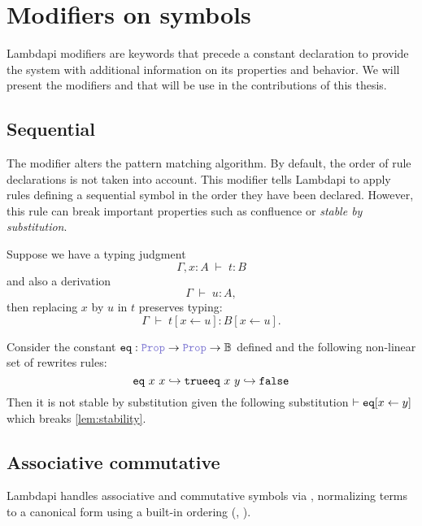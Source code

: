 \section{Modifiers on symbols}

Lambdapi modifiers are keywords that precede a constant declaration to provide the system with additional information on its properties and behavior.
We will present the modifiers  and  that will be use in the contributions of this thesis.

\subsection{Sequential}

The modifier  alters the pattern matching algorithm.
By default, the order of rule declarations is not taken into account.
This modifier tells Lambdapi to apply rules defining a sequential symbol in the order they have been declared.
However, this rule can break important properties such as confluence or \emph{stable by substitution}.

\begin{lemma}\label{lem:stability}
Suppose we have a typing judgment
\[
  \Gamma, x : A \;\vdash\; t : B
\]
and also a derivation
\[
  \Gamma \;\vdash\; u : A ,
\]
then replacing $x$ by $u$ in $t$ preserves typing:
\[
  \Gamma \;\vdash\; t[x \leftarrow u] : B[x \leftarrow u] .
\]
\end{lemma}

\begin{example}
Consider the constant $\kw{eq}: \prop \ra \prop \ra \B$ defined  and the following non-linear set of rewrites rules:
\[
    \texttt{\upshape{eq}}~x~x \hookrightarrow \texttt{\upshape{true}}\\
    \texttt{\upshape{eq}}~x~y \hookrightarrow \texttt{\upshape{false}}
\]
Then it is not stable by substitution given the following substitution $\vdash\texttt{\upshape{eq}}[x \leftarrow y]$ which breaks \cref{lem:stability}.
\end{example}

\subsection{Associative commutative}

Lambdapi handles associative and commutative symbols via , normalizing terms to a canonical form using a built-in ordering (\cite{ACorigin}, \cite[\S 5]{univAC}).

